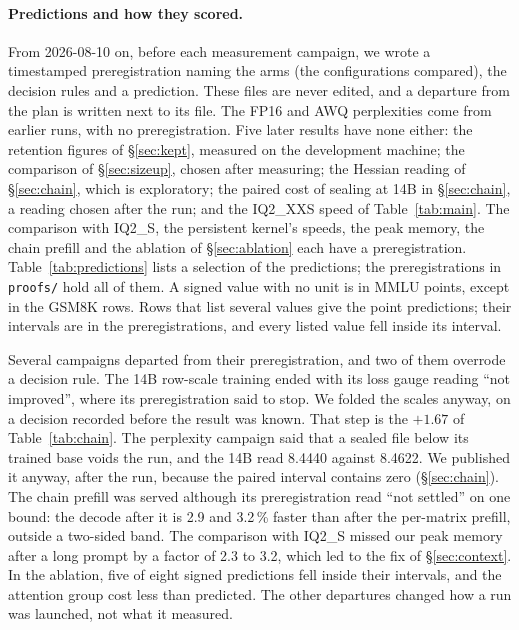 \paragraph{Predictions and how they scored.} From 2026-08-10 on, before each
measurement campaign, we wrote a timestamped preregistration naming the arms
(the configurations compared), the decision rules and a prediction. These
files are never edited, and a departure from the plan is written next to its
file. The FP16 and AWQ perplexities come from earlier runs, with no
preregistration. Five later results have none either: the retention figures of
\S\ref{sec:kept}, measured on the development machine; the comparison of
\S\ref{sec:sizeup}, chosen after measuring; the Hessian reading of
\S\ref{sec:chain}, which is exploratory; the paired cost of sealing at 14B in
\S\ref{sec:chain}, a reading chosen after the run; and the IQ2\_XXS speed of
Table~\ref{tab:main}. The comparison with IQ2\_S, the persistent kernel's
speeds, the peak memory, the chain prefill and the ablation of
\S\ref{sec:ablation} each have a preregistration. Table~\ref{tab:predictions} lists a selection of the
predictions; the preregistrations in \texttt{proofs/} hold all of them. A
signed value with no unit is in MMLU points, except in the GSM8K rows. Rows
that list several values give the point predictions; their intervals are in
the preregistrations, and every listed value fell inside its interval.

Several campaigns departed from their preregistration, and two of them
overrode a decision rule. The 14B row-scale training ended with its loss gauge
reading ``not improved'', where its preregistration said to stop. We folded
the scales anyway, on a decision recorded before the result was known. That
step is the $+1.67$ of Table~\ref{tab:chain}. The perplexity campaign said
that a sealed file below its trained base voids the run, and the 14B read
8.4440 against 8.4622. We published it anyway, after the run, because the
paired interval contains zero (\S\ref{sec:chain}). The chain prefill was
served although its preregistration read ``not settled'' on one bound: the
decode after it is 2.9 and 3.2\,\% faster than after the per-matrix prefill,
outside a two-sided band. The comparison with IQ2\_S missed our peak memory
after a long prompt by a factor of 2.3 to 3.2, which led to the fix of
\S\ref{sec:context}. In the ablation, five of eight signed predictions fell
inside their intervals, and the attention group cost less than predicted. The
other departures changed how a run was launched, not what it measured.


